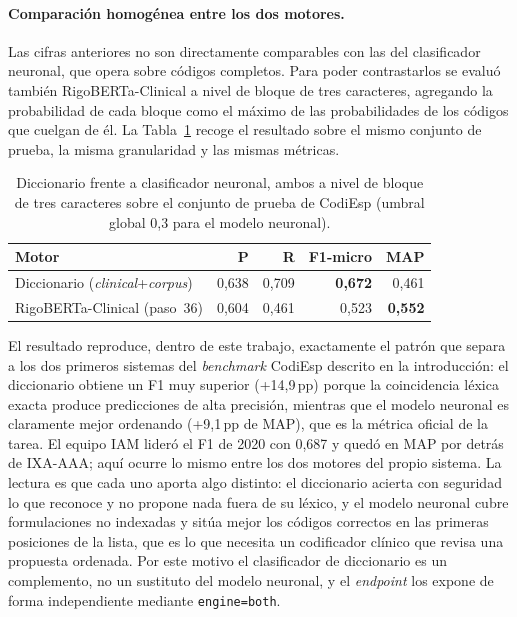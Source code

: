 \paragraph{Comparación homogénea entre los dos motores.}
Las cifras anteriores no son directamente comparables con las del clasificador neuronal, que opera sobre códigos completos. Para poder contrastarlos se evaluó también RigoBERTa-Clinical a nivel de bloque de tres caracteres, agregando la probabilidad de cada bloque como el máximo de las probabilidades de los códigos que cuelgan de él. La Tabla~\ref{tab:motores} recoge el resultado sobre el mismo conjunto de prueba, la misma granularidad y las mismas métricas.

\begin{table}[h]
\centering
\small
\caption{Diccionario frente a clasificador neuronal, ambos a nivel de bloque de tres caracteres sobre el conjunto de prueba de CodiEsp (umbral global 0,3 para el modelo neuronal).}
\label{tab:motores}
\begin{tabular}{lrrrr}
\hline
\textbf{Motor} & \textbf{P} & \textbf{R} & \textbf{F1-micro} & \textbf{MAP} \\
\hline
Diccionario (\emph{clinical}+\emph{corpus}) & 0{,}638 & 0{,}709 & \textbf{0{,}672} & 0{,}461 \\
RigoBERTa-Clinical (paso~36) & 0{,}604 & 0{,}461 & 0{,}523 & \textbf{0{,}552} \\
\hline
\end{tabular}
\end{table}

El resultado reproduce, dentro de este trabajo, exactamente el patrón que separa a los dos primeros sistemas del \emph{benchmark} CodiEsp descrito en la introducción: el diccionario obtiene un F1 muy superior (+14{,}9\,pp) porque la coincidencia léxica exacta produce predicciones de alta precisión, mientras que el modelo neuronal es claramente mejor ordenando (+9{,}1\,pp de MAP), que es la métrica oficial de la tarea. El equipo IAM lideró el F1 de 2020 con 0,687 y quedó en MAP por detrás de IXA-AAA; aquí ocurre lo mismo entre los dos motores del propio sistema. La lectura es que cada uno aporta algo distinto: el diccionario acierta con seguridad lo que reconoce y no propone nada fuera de su léxico, y el modelo neuronal cubre formulaciones no indexadas y sitúa mejor los códigos correctos en las primeras posiciones de la lista, que es lo que necesita un codificador clínico que revisa una propuesta ordenada. Por este motivo el clasificador de diccionario es un complemento, no un sustituto del modelo neuronal, y el \emph{endpoint} los expone de forma independiente mediante \texttt{engine=\textquotedbl{}both\textquotedbl{}}.

